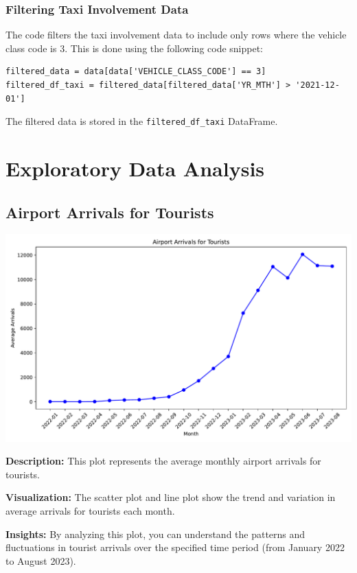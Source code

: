 \documentclass{article}
\begin{document}
\subsubsection{Filtering Taxi Involvement Data}
The code filters the taxi involvement data to include only rows where the vehicle class code is 3. This is done using the following code snippet:

\begin{lstlisting}
filtered_data = data[data['VEHICLE_CLASS_CODE'] == 3]
filtered_df_taxi = filtered_data[filtered_data['YR_MTH'] > '2021-12-01']
\end{lstlisting}

The filtered data is stored in the \texttt{filtered\_df\_taxi} DataFrame.


\section{Exploratory Data Analysis}
\subsection{Airport Arrivals for Tourists}
\includegraphics[width=\textwidth]{tourists_arrivals.pdf}

\textbf{Description:} This plot represents the average monthly airport arrivals for tourists.

\textbf{Visualization:} The scatter plot and line plot show the trend and variation in average arrivals for tourists each month.

\textbf{Insights:} By analyzing this plot, you can understand the patterns and fluctuations in tourist arrivals over the specified time period (from January 2022 to August 2023).
\end{document}
